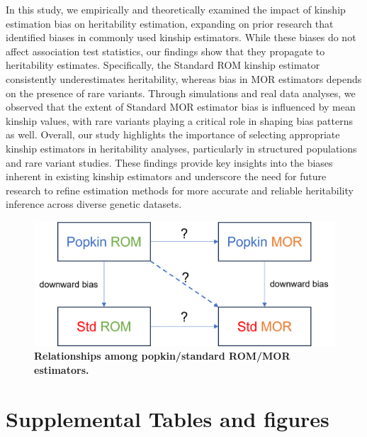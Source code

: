 \documentclass[11pt]{article}
\newcommand{\beginsupplement}{%
  \setcounter{table}{0}
  \renewcommand{\thetable}{S\arabic{table}}%
  \setcounter{figure}{0}
  \renewcommand{\thefigure}{S\arabic{figure}}%
  \setcounter{section}{0}
  \renewcommand{\thesection}{S\arabic{section}}%
  \setcounter{equation}{0}
  \renewcommand{\theequation}{S\arabic{equation}}%
  \setcounter{page}{1}
  \renewcommand{\thepage}{S\arabic{page}}%
}
\begin{document}
In this study, we empirically and theoretically examined the impact of kinship estimation bias on heritability estimation, expanding on prior research that identified biases in commonly used kinship estimators. While these biases do not affect association test statistics, our findings show that they propagate to heritability estimates. Specifically, the Standard ROM kinship estimator consistently underestimates heritability, whereas bias in MOR estimators depends on the presence of rare variants. Through simulations and real data analyses, we observed that the extent of Standard MOR estimator bias is influenced by mean kinship values, with rare variants playing a critical role in shaping bias patterns as well. Overall, our study highlights the importance of selecting appropriate kinship estimators in heritability analyses, particularly in structured populations and rare variant studies. These findings provide key insights into the biases inherent in existing kinship estimators and underscore the need for future research to refine estimation methods for more accurate and reliable heritability inference across diverse genetic datasets.






\begin{figure}[bp!]
  \centering
  \includegraphics[width=\textwidth]{data/est_relationships.png}
  \caption{
    {\bf Relationships among popkin/standard ROM/MOR estimators.}
    }
  \label{fig:est_relationship}
\end{figure}


\newpage

\printbibliography

\newpage

\beginsupplement

\section{Supplemental Tables and figures}
\end{document}
